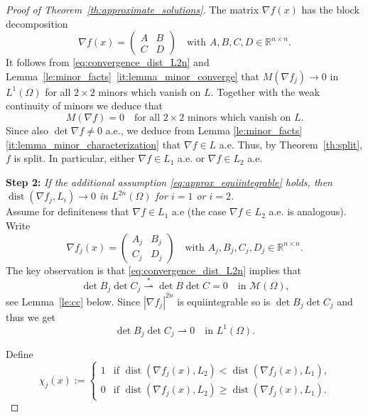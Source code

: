 \documentclass[titlepage]{amsart}
\numberwithin{equation}{section}
\theoremstyle{plain}
\theoremstyle{definition}
\theoremstyle{remark}
\newcommand{\dist}{\operatorname{dist}}
\newcommand{\R}{\mathbb{R}}
\newcommand{\g}{\nabla }
\begin{document}
\begin{proof}[Proof of Theorem~\ref{th:approximate_solutions}]
The matrix $\g f(x)$ has the block decomposition
\begin{equation*}
\g f(x) = \begin{pmatrix} A & B \\ C & D \end{pmatrix} \quad \text{with $A,B,C,D \in \R^{n \times n}$.}
\end{equation*}
It follows from 
 \eqref{eq:convergence_dist_L2n} and 
Lemma~\ref{le:minor_facts}~\eqref{it:lemma_minor_converge}
that  $M(\g f_j) \to 0$ in $L^1(\Omega)$  for all $2 \times 2$ minors which vanish on
$L$. Together with the weak continuity of minors we deduce that
$$ 
M(\g f) = 0 \quad \text{for all $2 \times 2$ minors which vanish on $L$.}
$$
Since also $\det \g f \ne 0$ a.e., we deduce from Lemma \ref{le:minor_facts} \eqref{it:lemma_minor_characterization} that $\nabla f \in L$ a.e. Thus,  by 
Theorem~\ref{th:split}, $f$ is  split. In particular, either $\nabla f \in L_1$ a.e. or $\nabla f \in L_2$ a.e.

\medskip

  {\bf Step 2:} \emph{If the additional assumption  \eqref{eq:approx_equiintegrable} holds, then $\dist(\g f_j, L_i) \to 0$ 
in $L^{2n}(\Omega)$  for $i=1$ or $i=2$.} \\ 
Assume for definiteness that $\g f \in L_1$ a.e
(the case $\g f \in L_2$ a.e. is analogous).
 Write
\begin{equation*}
\g f_j(x) = \begin{pmatrix} A_j & B_j \\ C_j & D_j \end{pmatrix} \quad \text{with $A_j,B_j,C_j,D_j \in \R^{n \times n}$.}
\end{equation*}
The key observation is that
 \eqref{eq:convergence_dist_L2n} implies that
\begin{equation}  \label{eq:weak_continuity_detBC}
\det B_j \det C_j \overset{*}{\rightharpoonup}  \det B \det C = 0 \quad \text{in $\mathcal M(\Omega)$,}
\end{equation}
see Lemma~\ref{le:cc} below.
Since $|\g f_j|^{2n}$ is equiintegrable so is $\det B_j \det C_j$ and thus we get
\begin{equation}
 \label{eq:weak_continuity_detBC_L1}
 \det B_j \det C_j \rightharpoonup  0  \quad \text{in $L^1(\Omega)$.}
 \end{equation}




Define
 $$\chi_j(x)  := 
 \begin{cases} 1 & \text{if $\dist(\g f_j(x), L_2) < \dist(\g f_j(x), L_1)$,} \\
 0 & \text{if  $\dist(\g f_j(x), L_2) \ge \dist(\g f_j(x), L_1)$.}
 \end{cases}
 $$ 


\end{proof}
\end{document}
